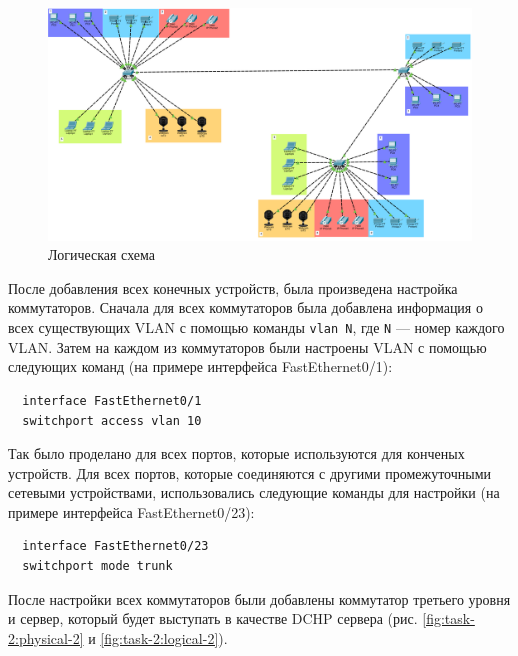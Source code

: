 \documentclass[a4paper, 14pt]{extarticle}
\begin{document}
\begin{figure}[H]
  \centering
  \includegraphics[width=\textwidth]{images/task-2/logical-1.png}
  \caption{Логическая схема}
  \label{fig:task-2:logical-1}
\end{figure}

После добавления всех конечных устройств, была произведена настройка
коммутаторов. Сначала для всех коммутаторов была добавлена информация о всех
существующих VLAN с помощью команды \texttt{vlan N}, где \texttt{N} --- номер
каждого VLAN. Затем на каждом из коммутаторов были настроены VLAN с помощью
следующих команд (на примере интерфейса FastEthernet0/1):
\begin{verbatim}
  interface FastEthernet0/1
  switchport access vlan 10
\end{verbatim}
Так было проделано для всех портов, которые используются для конченых устройств.
Для всех портов, которые соединяются с другими промежуточными сетевыми
устройствами, использовались следующие команды для настройки (на примере
интерфейса FastEthernet0/23):
\begin{verbatim}
  interface FastEthernet0/23
  switchport mode trunk
\end{verbatim}

После настройки всех коммутаторов были добавлены коммутатор третьего уровня и
сервер, который будет выступать в качестве DCHP сервера (рис.
\ref{fig:task-2:physical-2} и \ref{fig:task-2:logical-2}).
\end{document}
